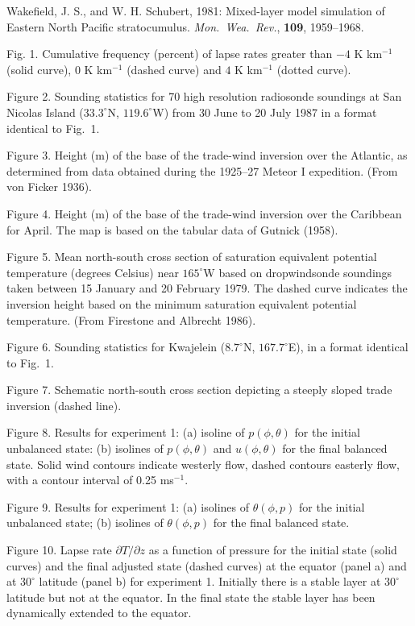 Wakefield, J. S., and W. H. Schubert, 1981:  Mixed-layer model simulation of
Eastern North Pacific stratocumulus.  {\sl Mon.\ Wea.\ Rev.}, {\bf 109},
1959--1968.


\endreferences


\begincaptions


Fig. 1. Cumulative frequency (percent) of lapse rates greater than $-4$ K
km$^{-1}$ (solid curve), $0$ K km$^{-1}$ (dashed curve) and $4$ K km$^{-1}$
(dotted curve).

Figure 2.  Sounding statistics for 70 high resolution radiosonde soundings at 
San Nicolas Island ($33.3^\circ$N, $119.6^\circ$W) from 30 June to 20 July
1987 in a format identical to Fig.~1.

Figure 3. Height (m) of the base of the trade-wind inversion over the
Atlantic,  as determined from data obtained during the 1925--27 Meteor I
expedition. (From von Ficker 1936).

Figure 4. Height (m) of the base of the trade-wind inversion over the
Caribbean for April.  The map is based on the tabular data of Gutnick (1958).

Figure 5.  Mean north-south cross section of saturation equivalent potential
temperature (degrees Celsius) near $165^\circ$W based on dropwindsonde
soundings taken between 15 January and 20 February 1979.  The dashed curve
indicates the inversion height based on the minimum saturation equivalent
potential temperature.  (From Firestone and Albrecht 1986).

Figure 6.  Sounding statistics for Kwajelein ($8.7^\circ$N, $167.7^\circ$E),
in a format identical to Fig.~1.

Figure 7. Schematic north-south cross section depicting a steeply sloped trade
inversion (dashed line).

Figure 8. Results for experiment 1: (a) isoline of $p(\phi,\theta)$ for the
initial unbalanced state: (b) isolines of $p(\phi,\theta)$ and
$u(\phi,\theta)$
for the final balanced state. Solid wind contours indicate westerly flow,
dashed contours easterly flow, with a contour interval of 0.25 ms$^{-1}$.

Figure 9. Results for experiment 1: (a) isolines of $\theta(\phi,p)$ for the
initial unbalanced state;
(b) isolines of $\theta(\phi,p)$ for the final balanced state.

Figure 10.  Lapse rate $\partial T/\partial z$ as a function of pressure for
the initial state (solid curves) and the final adjusted state (dashed curves)
at the equator (panel a) and at $30^\circ$ latitude (panel b) for experiment
1.  Initially there is a stable layer at $30^\circ$ latitude but not at the
equator.  In the final state the stable layer has been dynamically extended to
the equator.

